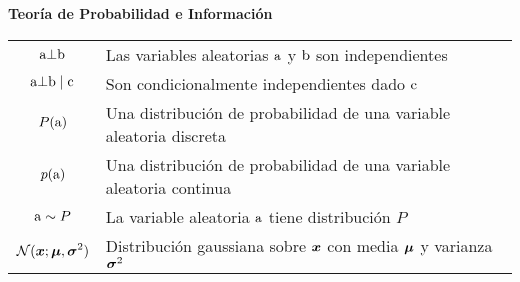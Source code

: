 \vspace{\notationgap}
\begin{minipage}{\textwidth}
\centerline{\bf Teoría de Probabilidad e Información}
\bgroup
\def\arraystretch{1.5}
\begin{tabular}{cp{}}
$\displaystyle {\textnormal{a}} \bot {\textnormal{b}}$ & Las variables aleatorias ${\textnormal{a}}$ y ${\textnormal{b}}$ son independientes\\
$\displaystyle {\textnormal{a}} \bot {\textnormal{b}} \mid {\textnormal{c}} $ & Son condicionalmente independientes dado ${\textnormal{c}}$\\
$\displaystyle P({\textnormal{a}})$ & Una distribución de probabilidad de una variable aleatoria discreta\\
$\displaystyle p({\textnormal{a}})$ & Una distribución de probabilidad de una variable aleatoria continua\\
$\displaystyle {\textnormal{a}} \sim P$ & La variable aleatoria ${\textnormal{a}}$ tiene distribución $P$\\%
$\displaystyle \mathcal{N} ( {\bm{x}} ; {\bm{\mu}} , {\bm{\sigma}}^2)$ & Distribución gaussiana %
sobre ${\bm{x}}$ con media ${\bm{\mu}}$ y varianza ${\bm{\sigma}}^2$ \\
\end{tabular}
\egroup
{}
\end{minipage}

